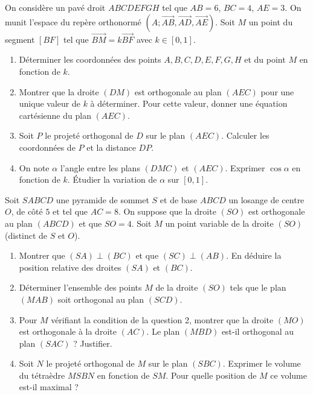 \documentclass[11pt]{article}
\begin{document}
\begin{exercice}
On considère un pavé droit $ABCDEFGH$ tel que $AB=6$, $BC=4$, $AE=3$. On munit l'espace du repère orthonormé $(A; \overrightarrow{AB}, \overrightarrow{AD}, \overrightarrow{AE})$. Soit $M$ un point du segment $[BF]$ tel que $\overrightarrow{BM}=k\overrightarrow{BF}$ avec $k\in[0,1]$.
\begin{enumerate}
    \item Déterminer les coordonnées des points $A,B,C,D,E,F,G,H$ et du point $M$ en fonction de $k$.
    \item Montrer que la droite $(DM)$ est orthogonale au plan $(AEC)$ pour une unique valeur de $k$ à déterminer. Pour cette valeur, donner une équation cartésienne du plan $(AEC)$.
    \item Soit $P$ le projeté orthogonal de $D$ sur le plan $(AEC)$. Calculer les coordonnées de $P$ et la distance $DP$.
    \item On note $\alpha$ l'angle entre les plans $(DMC)$ et $(AEC)$. Exprimer $\cos\alpha$ en fonction de $k$. Étudier la variation de $\alpha$ sur $[0,1]$.
\end{enumerate}
\end{exercice}

\begin{exercice}
Soit $SABCD$ une pyramide de sommet $S$ et de base $ABCD$ un losange de centre $O$, de côté $5$ et tel que $AC=8$. On suppose que la droite $(SO)$ est orthogonale au plan $(ABCD)$ et que $SO=4$. Soit $M$ un point variable de la droite $(SO)$ (distinct de $S$ et $O$).
\begin{enumerate}
    \item Montrer que $(SA)\perp (BC)$ et que $(SC)\perp (AB)$. En déduire la position relative des droites $(SA)$ et $(BC)$.
    \item Déterminer l'ensemble des points $M$ de la droite $(SO)$ tels que le plan $(MAB)$ soit orthogonal au plan $(SCD)$.
    \item Pour $M$ vérifiant la condition de la question 2, montrer que la droite $(MO)$ est orthogonale à la droite $(AC)$. Le plan $(MBD)$ est-il orthogonal au plan $(SAC)$ ? Justifier.
    \item Soit $N$ le projeté orthogonal de $M$ sur le plan $(SBC)$. Exprimer le volume du tétraèdre $MSBN$ en fonction de $SM$. Pour quelle position de $M$ ce volume est-il maximal ?
\end{enumerate}
\end{exercice}
\end{document}

